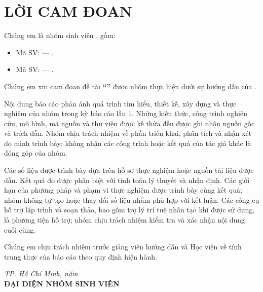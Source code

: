 \chapter*{LỜI CAM ĐOAN}

Chúng em là nhóm sinh viên \reportgroup, gồm:
\begin{itemize}
    \item Mã SV: \reportstudentoneid{} — \textbf{\reportstudentone}.
    \item Mã SV: \reportstudenttwoid{} — \textbf{\reportstudenttwo}.
\end{itemize}
Chúng em xin cam đoan đề tài \textbf{``\reporttitle''} được nhóm thực hiện dưới sự hướng dẫn của \textbf{\reportsupervisor}.

Nội dung báo cáo phản ánh quá trình tìm hiểu, thiết kế, xây dựng và thực nghiệm của nhóm trong kỳ báo cáo lần 1. Những kiến thức, công trình nghiên cứu, mô hình, mã nguồn và thư viện được kế thừa đều được ghi nhận nguồn gốc và trích dẫn. Nhóm chịu trách nhiệm về phần triển khai, phân tích và nhận xét do mình trình bày; không nhận các công trình hoặc kết quả của tác giả khác là đóng góp của nhóm.

Các số liệu được trình bày dựa trên hồ sơ thực nghiệm hoặc nguồn tài liệu được dẫn. Kết quả đo được phân biệt với tính toán lý thuyết và nhận định. Các giới hạn của phương pháp và phạm vi thực nghiệm được trình bày cùng kết quả; nhóm không tự tạo hoặc thay đổi số liệu nhằm phù hợp với kết luận. Các công cụ hỗ trợ lập trình và soạn thảo, bao gồm trợ lý trí tuệ nhân tạo khi được sử dụng, là phương tiện hỗ trợ; nhóm chịu trách nhiệm kiểm tra và xác nhận nội dung cuối cùng.

Chúng em chịu trách nhiệm trước giảng viên hướng dẫn và Học viện về tính trung thực của báo cáo theo quy định hiện hành.

\vspace{0.7cm}
\begin{flushright}
\textit{TP. Hồ Chí Minh, năm \reportyear}\\[0.2cm]
\textbf{ĐẠI DIỆN NHÓM SINH VIÊN}\\[1.2cm]
\textbf{\reportrepresentative}
\end{flushright}
